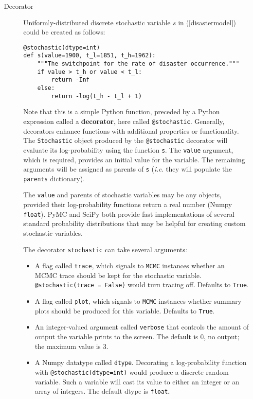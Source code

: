 \begin{description}
    
    \item[Decorator] Uniformly-distributed discrete stochastic variable $s$ in (\ref{disastermodel}) could be created as follows:
    \begin{verbatim}
@stochastic(dtype=int)
def s(value=1900, t_l=1851, t_h=1962):
    """The switchpoint for the rate of disaster occurrence."""
    if value > t_h or value < t_l:
        return -Inf
    else:
        return -log(t_h - t_l + 1) 
    \end{verbatim}
Note that this is a simple Python function, preceded by a Python expression called a \textbf{decorator}, here called \texttt{@stochastic}. Generally, decorators enhance functions with additional properties or functionality. The \texttt{Stochastic} object produced by the \texttt{@stochastic} decorator will evaluate its log-probability using the function \texttt{s}. The \texttt{value} argument, which is required, provides an initial value for the variable. The remaining arguments will be assigned as parents of \texttt{s} (\emph{i.e.} they will populate the \texttt{parents} dictionary).

The \texttt{value} and parents of stochastic variables may be any objects, provided their log-probability functions return a real number (Numpy \texttt{float}). PyMC and SciPy both provide fast implementations of several standard probability distributions that may be helpful for creating custom stochastic variables.

    The decorator \texttt{stochastic} can take several arguments: 
    \begin{itemize}
        \item A flag called \texttt{trace}, which signals to \texttt{MCMC} instances whether an MCMC trace should be kept for the stochastic variable. \texttt{@stochastic(trace = False)} would turn tracing off. Defaults to \texttt{True}.
        \item A flag called \texttt{plot}, which signals to \texttt{MCMC} instances whether summary plots should be produced for this variable. Defaults to \texttt{True}.
        \item An integer-valued argument called \texttt{verbose} that controls the amount of output the variable prints to the screen. The default is $0$, no output; the maximum value is $3$. 
        \item A Numpy datatype called \texttt{dtype}. Decorating a log-probability function with \texttt{@stochastic(dtype=int)} would produce a discrete random variable. Such a variable will cast its value to either an integer or an array of integers. The default dtype is \texttt{float}.
    \end{itemize} 


\end{description}
